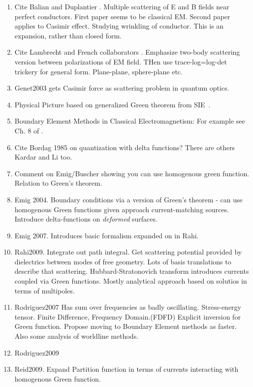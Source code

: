 \begin{enumerate}
\item Cite Balian and Duplantier \cite{Balian1977, Balian1978}.  Multiple scattering of E and B fields
near perfect conductors.  First paper seems to be classical EM.  Second paper applies to Casimir effect.
Studying wrinkling of conductor.  This is an expansion, rather than closed form.  
 \item Cite Lambrecht and French collaborators
   \cite{Lambrecht2006, MaiaNeto2008,Canaguier-Durand2012}.
    Emphasize two-body scattering version between polarizations of EM field.  THen use trace-log=log-det
    trickery for general form.  Plane-plane, sphere-plane etc.  
\item Genet2003 gets Casimir force as scattering problem in quantum optics.  
\item Physical Picture based on generalized Green theorem from 
  SIE~\cite{Stratton1941}.
  \item Boundary Element Methods in Classical Electromagnetism:
    For example see Ch. 8 of \cite{Chew1995}.  
\item Cite Bordag 1985 on quantization with delta functions?  There are others
Kardar and Li too.  %
\item Comment on Emig/Buscher showing you can use homogenous green function.
  Relation to Green's theorem.
\item Emig 2004.  Boundary conditions via a version of Green's theorem - can use homogenous Green 
functions given approach current-matching sources.  Introduce delta-functions on \emph{deformed} surfaces.  
\item Emig 2007.  Introduces basic formalism expanded on in Rahi.  
\item Rahi2009.  Integrate out path integral.  Get scattering potential provided by dielectrics between
modes of free geometry.  Lots of basis translations to describe that scattering.  Hubbard-Stratonovich transform
introduces currents coupled via Green functions.  Mostly analytical approach based on solutios in terms of multipoles.
\item Rodriguez2007
Has sum over frequencies as badly oscillating.  Stress-energy tensor.  Finite Difference, Frequency Domain.(FDFD)
Explicit inversion for Green function.  Propose moving to Boundary Element methods as faster.
Also some analysis of worldline methods.
\item Rodriguez2009
\item Reid2009.  Expand Partition function in terms of currents interacting with homogenous Green function.

\end{enumerate}
